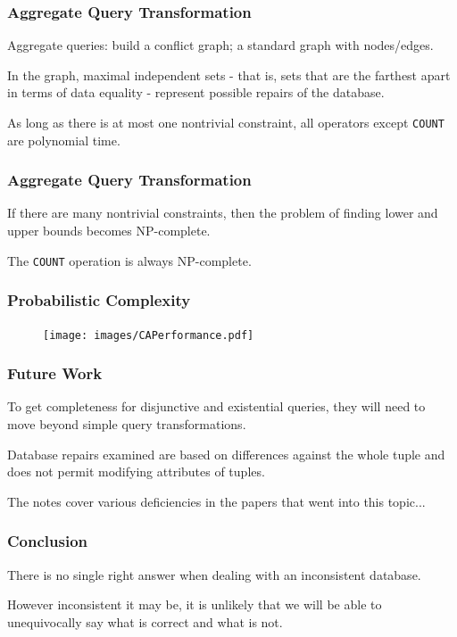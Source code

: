 \begin{frame}
\frametitle{Aggregate Query Transformation}

Aggregate queries: build a conflict graph; a standard graph with nodes/edges. 

In the graph, maximal independent sets - that is, sets that are the farthest apart in terms of data equality - represent possible repairs of the database. 

As long as there is at most one nontrivial constraint, all operators except \texttt{COUNT} are polynomial time.

\end{frame}


\begin{frame}
\frametitle{Aggregate Query Transformation}

If there are many nontrivial constraints, then the problem of finding lower and upper bounds becomes NP-complete. 

The \texttt{COUNT} operation is always NP-complete.


\end{frame}


\begin{frame}
\frametitle{Probabilistic Complexity}

\begin{figure}[!h]
  \centering \texttt{[image: images/CAPerformance.pdf]}
\end{figure}


\end{frame}


\begin{frame}
\frametitle{Future Work}

To get completeness for disjunctive and existential queries, they will need to move beyond simple query transformations.

Database repairs examined are based on differences against the whole tuple and does not permit modifying attributes of tuples.

The notes cover various deficiencies in the papers that went into this topic...

\end{frame}


\begin{frame}
\frametitle{Conclusion}

There is no single right answer when dealing with an inconsistent database. 

However inconsistent it may be, it is unlikely that we will be able to unequivocally say what is correct and what is not. 

\end{frame}




